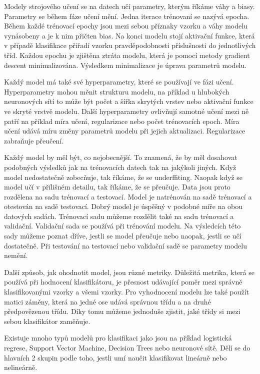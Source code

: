 \documentclass[FM,BP]{tulthesis}
\begin{document}
Modely strojového učení se na datech učí parametry, kterým říkáme váhy a biasy. Parametry se během fáze učení mění. Jedna iterace trénovaní se nazývá epocha. Během každé trénovací epochy jsou mezi sebou příznaky vzorku a váhy modelu vynásobeny a je k nim přičten bias. Na konci modelu stojí aktivační funkce, která v případě klasifikace přiřadí vzorku pravděpodobnosti příslušnosti do jednotlivých tříd. Každou epochu je zjištěna ztráta modelu, která je pomocí metody gradient descent minimalizována. Výsledkem minimalizace je úprava parametrů modelu.

Každý model má také své hyperparametry, které se používají ve fázi učení.\cite{leonel_2019} Hyperparametry mohou měnit strukturu modelu, na příklad u hlubokých neuronových sítí to může být počet a šířka skrytých vrstev nebo aktivační funkce ve skryté vrstvě modelu. Další hyperparametry ovlivňují samotné učení mezi ně patří na příklad míra učení, regularizace nebo počet trénovacích epoch. Míra učení udává míru změny parametrů modelu při jejich aktualizaci. Regularizace zabraňuje přeučení.

Každý model by měl být, co nejobecnější. To znamená, že by měl dosahovat podobných výsledků jak na trénovacích datech tak na jakýkoli jiných. Když model nedostatečně zobecňuje, tak říkáme, že se underffiting. Naopak když se model učí v přílišném detailu, tak říkáme, že se přeučuje. Data jsou proto rozdělena na sadu trénovací a testovací. Model je natrénován na sadě trénovací a otestován na sadě testovací. Dobrý model je úspěšný v podobné míře na obou datových sadách. Trénovací sadu můžeme rozdělit také na sadu trénovací a validační. Validační sada se používá při trénování modelu. Na výsledcích této sady můžeme poznat dříve, jestli se model přeučuje nebo naopak, jestli se učí dostatečně. Při testování na testovací nebo validační sadě se parametry modelu nemění. 

Další způsob, jak ohodnotit model, jsou různé metriky. Důležitá metrika, která se používá při hodnocení klasifikátoru, je přesnost udávající poměr mezi správně klasifikovanými vzorky a všemi vzorky. Pro vyhodnocení modelu lze také použít matici záměny, která na jedné ose udává správnou třídu a na druhé předpovězenou třídu. Díky tomu můžeme jednoduše zjistit, jaké třídy si mezi sebou klasifikátor zaměňuje.

Existuje mnoho typů modelů pro klasifikaci jako jsou na příklad logistická regrese, Support Vector Machine, Decision Trees nebo neuronové sítě. \cite{fumo_2017} Dělí se do hlavních 2 skupin podle toho, jestli umí naučit klasifikovat lineárně nebo nelineárně. 
\end{document}
